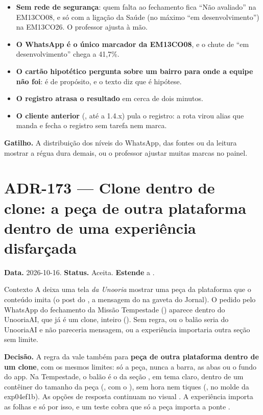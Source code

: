 \begin{itemize}
  \item \textbf{Sem rede de segurança}: quem falta ao fechamento fica
    \enquote{Não avaliado} na EM13CO08, e só com a ligação da Saúde (no
    máximo \enquote{em desenvolvimento}) na EM13CO26. O professor ajusta à mão.
  \item \textbf{O WhatsApp é o único marcador da EM13CO08}, e o chute de
    \enquote{em desenvolvimento} chega a 41,7\%.
  \item \textbf{O cartão hipotético pergunta sobre um bairro para onde a
    equipe não foi}: é de propósito, e o texto diz que é hipótese.
  \item \textbf{O registro atrasa o resultado} em cerca de dois minutos.
  \item \textbf{O cliente anterior} (, até a
    1.4.x) pula o registro: a rota virou alias que manda e fecha o registro
    sem tarefa nem marca.
\end{itemize}

\textbf{Gatilho.} A distribuição dos níveis do WhatsApp, das fontes ou da
leitura mostrar a régua dura demais, ou o professor ajustar muitas marcas no
painel.

\section{ADR-173 --- Clone dentro de clone: a peça de outra plataforma dentro de uma experiência disfarçada}
\label{adr:clone-dentro-de-clone}

\textbf{Data.} 2026-10-16. \textbf{Status.} Aceita. \textbf{Estende} a
.

\begin{especificacao}{Contexto}
A  deixa uma tela \emph{da Unooria} mostrar uma peça da
plataforma que o conteúdo imita (o post do , a mensagem do
 na gaveta do Jornal). O pedido pelo WhatsApp do fechamento da
Missão Tempestade () aparece dentro do UnooriaAI, que já é um
clone, inteiro (). Sem regra, ou o balão seria do UnooriaAI e não
pareceria mensagem, ou a experiência importaria outra seção sem limite.
\end{especificacao}

\textbf{Decisão.} A regra da  vale também para \textbf{peça de
outra plataforma dentro de um clone}, com os mesmos limites: só a peça, nunca a
barra, as abas ou o fundo do app. Na Tempestade, o balão é o
 da seção , em tema claro, dentro de um
contêiner do tamanho da peça (, com o
), sem hora nem tiques
(, no molde da exp04ef1b). As opções
de resposta continuam no visual . A experiência importa as folhas
 e  só por isso, e um teste cobra que
só a peça importa a ponte .

